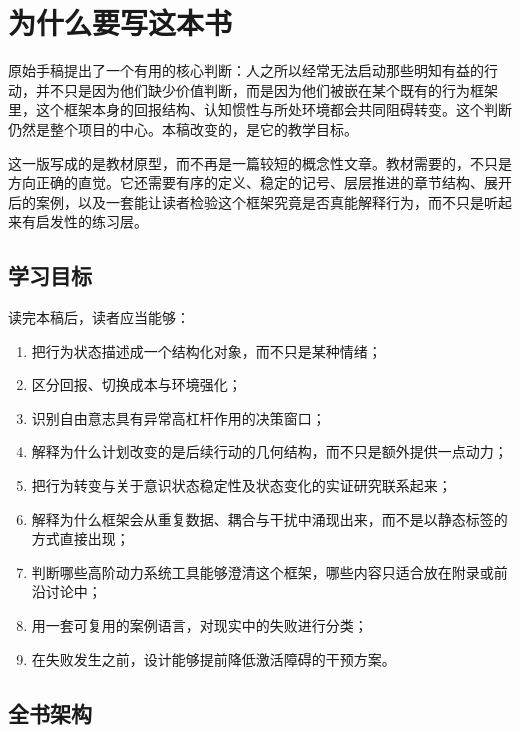 \chapter{为什么要写这本书}
\label{ch:overview}

原始手稿提出了一个有用的核心判断：人之所以经常无法启动那些明知有益的行动，并不只是因为他们缺少价值判断，而是因为他们被嵌在某个既有的行为框架里，这个框架本身的回报结构、认知惯性与所处环境都会共同阻碍转变。这个判断仍然是整个项目的中心。本稿改变的，是它的教学目标。

这一版写成的是教材原型，而不再是一篇较短的概念性文章。教材需要的，不只是方向正确的直觉。它还需要有序的定义、稳定的记号、层层推进的章节结构、展开后的案例，以及一套能让读者检验这个框架究竟是否真能解释行为，而不只是听起来有启发性的练习层。

\section{学习目标}

读完本稿后，读者应当能够：
\begin{enumerate}[nosep]
  \item 把行为状态描述成一个结构化对象，而不只是某种情绪；
  \item 区分回报、切换成本与环境强化；
  \item 识别自由意志具有异常高杠杆作用的决策窗口；
  \item 解释为什么计划改变的是后续行动的几何结构，而不只是额外提供一点动力；
  \item 把行为转变与关于意识状态稳定性及状态变化的实证研究联系起来；
  \item 解释为什么框架会从重复数据、耦合与干扰中涌现出来，而不是以静态标签的方式直接出现；
  \item 判断哪些高阶动力系统工具能够澄清这个框架，哪些内容只适合放在附录或前沿讨论中；
  \item 用一套可复用的案例语言，对现实中的失败进行分类；
  \item 在失败发生之前，设计能够提前降低激活障碍的干预方案。
\end{enumerate}

\section{全书架构}

